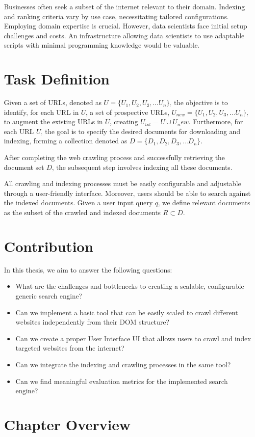 Businesses often seek a subset of the internet relevant to their domain. Indexing and ranking criteria vary by use case, necessitating tailored configurations. Employing domain expertise is crucial. However, data scientists face initial setup challenges and costs. An infrastructure allowing data scientists to use adaptable scripts with minimal programming knowledge would be valuable. 

\section{Task Definition}
Given a set of URLs, denoted as $U = \{U_1, U_2, U_3, ...U_n\}$, the objective is to identify, for each URL in $U$, a set of prospective URLs, $U_{new} = \{U_1, U_2, U_3, ...U_n\}$, to augment the existing URLs in $U$, creating $U_{tot} = U \cup U{_new}$. Furthermore, for each URL $U$, the goal is to specify the desired documents for downloading and indexing, forming a collection denoted as $D = \{D_1, D_2, D_3, ...D_n\}$.

After completing the web crawling process and successfully retrieving the document set $D$, the subsequent step involves indexing all these documents. 

All crawling and indexing processes must be easily configurable and adjustable through a user-friendly interface. Moreover, users should be able to search against the indexed documents. Given a user input query $q$, we define relevant documents as the subset of the crawled and indexed documents $R \subset D$.

\section{Contribution}

In this thesis, we aim to answer the following questions:

\begin{itemize}
  \item What are the challenges and bottlenecks to creating a scalable, configurable generic search engine?
\item Can we implement a basic tool that can be easily scaled to crawl different websites independently from their DOM structure?
    \item Can we create a proper User Interface UI that allows users to crawl and index targeted websites from the internet?
    \item Can we integrate the indexing and crawling processes in the same tool?
    \item Can we find meaningful evaluation metrics for the implemented search engine?
\end{itemize}
\section{Chapter Overview}
